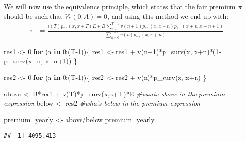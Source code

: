 \documentclass[
]{article}
\newenvironment{Shaded}{\begin{snugshade}}{\end{snugshade}}
\newcommand{\CommentTok}[1]{\textcolor[rgb]{0.56,0.35,0.01}{\textit{#1}}}
\newcommand{\ControlFlowTok}[1]{\textcolor[rgb]{0.13,0.29,0.53}{\textbf{#1}}}
\newcommand{\DecValTok}[1]{\textcolor[rgb]{0.00,0.00,0.81}{#1}}
\newcommand{\FunctionTok}[1]{\textcolor[rgb]{0.00,0.00,0.00}{#1}}
\newcommand{\NormalTok}[1]{#1}
\newcommand{\OtherTok}[1]{\textcolor[rgb]{0.56,0.35,0.01}{#1}}
\newcommand{\SpecialCharTok}[1]{\textcolor[rgb]{0.00,0.00,0.00}{#1}}
\begin{document}
We will now use the equivalence principle, which states that the fair
premium \(\pi\) should be such that \(V_{*}(0,A) = 0\), and using this
method we end up with: \[\begin{aligned}
\pi &= \frac{v(T)p_{**}(x,x+T)E + B\sum_{n=0}^{T-1}v(n+1)p_{**}(x,x+n)p_{*\dagger}(x+n,x+n+1)}{\sum_{n=0}^{T-1}v(n)p_{**}(x,x+n)}
\end{aligned}\]

\begin{Shaded}
\begin{Highlighting}[]
\NormalTok{res1 }\OtherTok{\textless{}{-}} \DecValTok{0} 
\ControlFlowTok{for}\NormalTok{ (n }\ControlFlowTok{in} \DecValTok{0}\SpecialCharTok{:}\NormalTok{(T}\DecValTok{{-}1}\NormalTok{))\{}
\NormalTok{  res1 }\OtherTok{\textless{}{-}}\NormalTok{ res1 }\SpecialCharTok{+} \FunctionTok{v}\NormalTok{(n}\SpecialCharTok{+}\DecValTok{1}\NormalTok{)}\SpecialCharTok{*}\FunctionTok{p\_surv}\NormalTok{(x, x}\SpecialCharTok{+}\NormalTok{n)}\SpecialCharTok{*}\NormalTok{(}\DecValTok{1}\SpecialCharTok{{-}}\FunctionTok{p\_surv}\NormalTok{(x}\SpecialCharTok{+}\NormalTok{n, x}\SpecialCharTok{+}\NormalTok{n}\SpecialCharTok{+}\DecValTok{1}\NormalTok{))}
\NormalTok{\}}

\NormalTok{res2 }\OtherTok{\textless{}{-}} \DecValTok{0} 
\ControlFlowTok{for}\NormalTok{ (n }\ControlFlowTok{in} \DecValTok{0}\SpecialCharTok{:}\NormalTok{(T}\DecValTok{{-}1}\NormalTok{))\{}
\NormalTok{  res2 }\OtherTok{\textless{}{-}}\NormalTok{ res2 }\SpecialCharTok{+} \FunctionTok{v}\NormalTok{(n)}\SpecialCharTok{*}\FunctionTok{p\_surv}\NormalTok{(x, x}\SpecialCharTok{+}\NormalTok{n)}
\NormalTok{\}}

\NormalTok{above }\OtherTok{\textless{}{-}}\NormalTok{ B}\SpecialCharTok{*}\NormalTok{res1 }\SpecialCharTok{+} \FunctionTok{v}\NormalTok{(T)}\SpecialCharTok{*}\FunctionTok{p\_surv}\NormalTok{(x,x}\SpecialCharTok{+}\NormalTok{T)}\SpecialCharTok{*}\NormalTok{E }\CommentTok{\#whats above in the premium expression}
\NormalTok{below }\OtherTok{\textless{}{-}}\NormalTok{ res2            }\CommentTok{\#whats below in the premium expression}

\NormalTok{premium\_yearly }\OtherTok{\textless{}{-}}\NormalTok{ above}\SpecialCharTok{/}\NormalTok{below}
\NormalTok{premium\_yearly}
\end{Highlighting}
\end{Shaded}

\begin{verbatim}
## [1] 4095.413
\end{verbatim}
\end{document}

